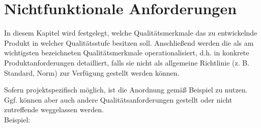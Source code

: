 
\chapter{Nichtfunktionale Anforderungen}

In diesem Kapitel wird festgelegt, welche Qualitätsmerkmale das zu entwickelnde
Produkt in welcher Qualitätsstufe besitzen soll. Anschließend werden die als am
wichtigsten bezeichneten Qualitätsmerkmale operationalisiert, d.h. in konkrete
Produktanforderungen detailliert, falls sie nicht als allgemeine Richtlinie (z.
B. Standard, Norm) zur Verfügung gestellt werden können.

Sofern projektspezifisch möglich, ist die Anordnung gemäß Beispiel zu nutzen.
Ggf. können aber auch andere Qualitätsanforderungen gestellt oder nicht
zutreffende weggelassen werden.\\
Beispiel:\\


